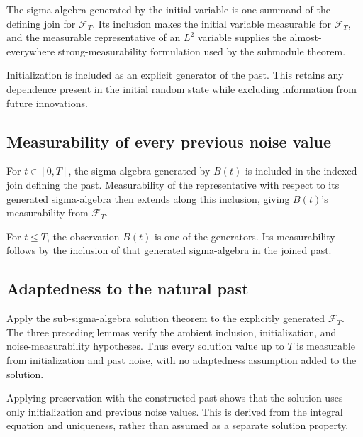 \documentclass[11pt,a4paper]{report}
\begin{document}
The sigma-algebra generated by the initial variable is one summand of the defining join for \(\mathcal F_T\). Its inclusion makes the initial variable measurable for \(\mathcal F_T\), and the measurable representative of an \(L^2\) variable supplies the almost-everywhere strong-measurability formulation used by the submodule theorem.



Initialization is included as an explicit generator of the past. This retains any dependence present in the initial random state while excluding information from future innovations.

\subsection{\texorpdfstring{Measurability of every previous noise value}{Measurability of every previous noise value}}
\label{report-step-UnadjustedLangevin-WeakForwardAdapted-lean-7}


For \(t\in[0,T]\), the sigma-algebra generated by \(B(t)\) is included in the indexed join defining the past. Measurability of the representative with respect to its generated sigma-algebra then extends along this inclusion, giving \(B(t)\)'s measurability from \(\mathcal F_T\).



For \(t\le T\), the observation \(B(t)\) is one of the generators. Its measurability follows by the inclusion of that generated sigma-algebra in the joined past.

\subsection{\texorpdfstring{Adaptedness to the natural past}{Adaptedness to the natural past}}
\label{report-step-UnadjustedLangevin-WeakForwardAdapted-lean-8}


Apply the sub-sigma-algebra solution theorem to the explicitly generated \(\mathcal F_T\). The three preceding lemmas verify the ambient inclusion, initialization, and noise-measurability hypotheses. Thus every solution value up to \(T\) is measurable from initialization and past noise, with no adaptedness assumption added to the solution.



Applying preservation with the constructed past shows that the solution uses only initialization and previous noise values. This is derived from the integral equation and uniqueness, rather than assumed as a separate solution property.
\end{document}
